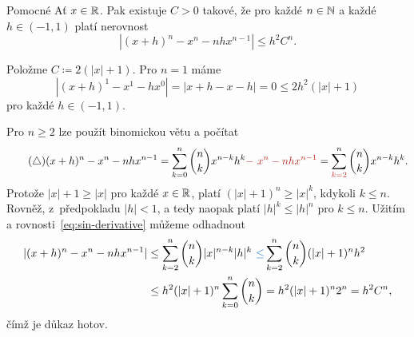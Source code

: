 \begin{lemma*}{Pomocné}
 Ať $x \in \mathbb{R}$. Pak existuje $C > 0$ takové, že pro každé $n \in \mathbb{N}$ a každé
 $h \in (-1,1)$ platí nerovnost
 \[
  |(x+h)^{n} - x^{n} - nhx^{n-1}| \leq h^2C^{n}.
 \]
\end{lemma*}
\begin{lemproof}
 Položme $C \coloneqq 2(|x| + 1)$. Pro $n = 1$ máme
 \[
  |(x+h)^{1} - x^{1} - hx^{0}| = |x + h - x - h| = 0 \leq 2h^2 (|x| + 1)
 \]
 pro každé $h \in (-1,1)$.
 
 Pro $n \geq 2$ lze použít binomickou větu a počítat
 \begin{equation*}
  \label{eq:sin-derivative}
  \tag{$\triangle$}
  (x+h)^{n} - x^{n} - nhx^{n-1} = \sum_{k=0}^{n} \binom{n}{k} x^{n-k} h^{k}
  \clr{-~x^{n} - nhx^{n-1}} = \sum_{\clr{k=2}}^{n} \binom{n}{k} x^{n-k}h^{k}.
 \end{equation*}
 Protože $|x| + 1 \geq |x|$ pro každé $x \in \mathbb{R}$, platí $(|x| + 1)^{n} \geq
 |x|^{k}$, kdykoli $k \leq n$. Rovněž, z~předpokladu $|h|<1$, a tedy naopak
 platí $|h|^{k} \leq |h|^{n}$ pro $k \leq n$. Užitím  a
 rovnosti~\eqref{eq:sin-derivative} můžeme odhadnout
 \begin{align*}
  |(x+h)^{n} - x^{n} - nhx^{n-1}| & \leq \sum_{k=2}^{n}
  \binom{n}{k}|x|^{n-k}|h|^{k} \clb{~\leq} \sum_{k=2}^{n} \binom{n}{k} (|x| +
  1)^{n}h^2\\
                                  & \leq h^2(|x| + 1)^{n} \sum_{k=0}^{n}
                                  \binom{n}{k} = h^2(|x| + 1)^{n} 2^{n} =
                                  h^2C^{n},
 \end{align*}
 čímž je důkaz hotov.
\end{lemproof}

